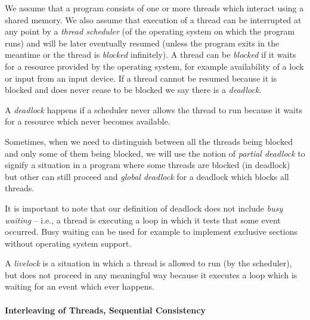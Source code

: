 We assume that a program consists of one or more threads which interact using a
shared memory.
We also assume that execution of a thread can be interrupted at any point by a
\emph{thread scheduler} (of the operating system on which the program runs) and
will be later eventually resumed (unless the program exits in the meantime or
the thread is \emph{blocked} infinitely).
A thread can be \emph{blocked} if it waits for a resource provided by the
operating system, for example availability of a lock or input from an input
device.
If a thread cannot be resumed because it is blocked and does never cease to be
blocked we say there is a \emph{deadlock}.

\begin{definition}\label{def:deadlock}
    A \emph{deadlock} happens if a scheduler never allows the thread to run
    because it waits for a resource which never becomes available.

    Sometimes, when we need to distinguish between all the threads being
    blocked and only some of them being blocked, we will use the notion of
    \emph{partial deadlock} to signify a situation in a program where some
    threads are blocked (in deadlock) but other can still proceed and
    \emph{global deadlock} for a deadlock which blocks all threads.
\end{definition}

It is important to note that our definition of deadlock does not include
\emph{busy waiting} -- i.e., a thread is executing a loop in which it tests
that some event occurred.
Busy waiting can be used for example to implement exclusive sections without
operating system support.

\begin{definition}[Livelock]\label{def:livelock}
    A \emph{livelock} is a situation in which a thread is allowed to run (by
    the scheduler), but does not proceed in any meaningful way because it
    executes a loop which is waiting for an event which ever happens.
\end{definition}

\paragraph{Interleaving of Threads, Sequential Consistency}

